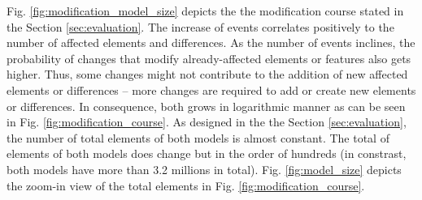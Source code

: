 \documentclass{llncs}
\begin{document}
Fig. \ref{fig:modification_model_size} depicts the the modification course stated in the Section \ref{sec:evaluation}. The increase of events correlates positively to the number of affected elements and differences. As the number of events inclines, the probability of changes that modify already-affected elements or features also gets higher. Thus, some changes might not contribute to the addition of new affected elements or differences -- more changes are required to add or create new elements or differences. In consequence, both grows in logarithmic manner as can be seen in Fig. \ref{fig:modification_course}. As designed in the the Section \ref{sec:evaluation}, the number of total elements of both models is almost constant. The total of elements of both models does change but in the order of hundreds (in constrast, both models have more than 3.2 millions in total). Fig. \ref{fig:model_size} depicts the zoom-in view of the total elements in Fig. \ref{fig:modification_course}.
\end{document}
